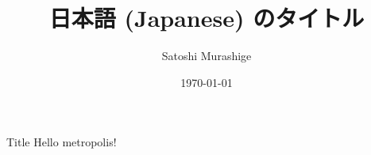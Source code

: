 \documentclass[10pt]{beamer}
\title{日本語 (Japanese) のタイトル}
\date{\today}
\author{Satoshi Murashige}
\institute{Mathematical Informatics Lab., NAIST}
\newcommand{\myinsertlogo}[1]{%
\begin{tikzpicture}[overlay, remember picture]
    \node[above left=1cm and .8cm of current page.south east] {\texttt{[image: \#1]}};
\end{tikzpicture}}
\begin{document}
    \begin{frame}[plain]
        \maketitle
    \end{frame}
    \begin{frame}{Title}
        Hello metropolis!
    \end{frame}
\end{document}
